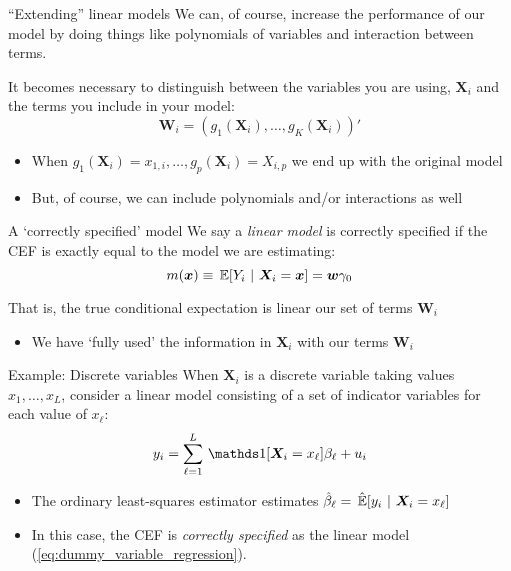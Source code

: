 \documentclass[aspectratio=169,t,11pt,table]{beamer}
\begin{document}
\begin{frame}{``Extending'' linear models}
  We can, of course, increase the performance of our model by doing things like polynomials of variables and interaction between terms.

  \bigskip
  It becomes necessary to distinguish between the variables you are using, $\bm{X}_i$ and the terms you include in your model:
  $$
    \bm{W}_i = \left( g_1(\bm{X}_i), \dots, g_K(\bm{X}_i) \right)'
  $$

  \medskip
  \begin{itemize}
    \item When $g_1(\bm{X}_i) = x_{1, i}, \dots, g_p(\bm{X}_i) = X_{i, p}$ we end up with the original model
    
    \item But, of course, we can include polynomials and/or interactions as well
  \end{itemize}
\end{frame}

\begin{frame}{A `correctly specified' model}
  We say a \emph{linear model} is \alert{correctly specified} if the CEF is exactly equal to the model we are estimating:
  $$
    m(\bm{x}) \equiv \expec{Y_i}{\bm{X}_i = \bm{x}}= \bm{w} \gamma_0
  $$

  \bigskip
  That is, the true conditional expectation is linear our set of terms $\bm{W}_i$
  \begin{itemize}
    \item We have `fully used' the information in $\bm{X}_i$ with our terms $\bm{W}_i$
  \end{itemize}
\end{frame}

\begin{frame}{Example: Discrete variables}
  When $\bm{X}_i$ is a discrete variable taking values $x_1, \dots, x_L$, consider a linear model consisting of a set of \alert{indicator variables} for each value of $x_\ell$:
  \begin{equation}\label{eq:dummy_variable_regression}
    y_i = \sum_{\ell = 1}^L \one{\bm{X}_i = x_\ell} \beta_\ell + u_i
  \end{equation}
  \pause
  \begin{itemize}
    \item The ordinary least-squares estimator estimates $\hat{\beta}_{\ell} = \expechat{y_i}{\bm{X}_i = x_\ell}$

    \pause
    \item In this case, the CEF is \emph{correctly specified} as the linear model (\ref{eq:dummy_variable_regression}).
  \end{itemize}
\end{frame}
\end{document}
